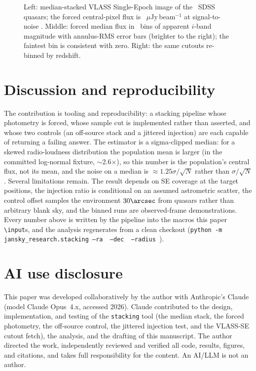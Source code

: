 \documentclass[twocolumn]{aastex631}
\newcommand{\code}[1]{\texttt{#1}}
\begin{document}
\begin{figure}
\caption{Left: median-stacked VLASS Single-Epoch image of the \stN\ SDSS quasars; the forced
central-pixel flux is \stFlux~$\mu$Jy\,beam$^{-1}$ at signal-to-noise \stSNR. Middle: forced median
flux in \stNbins\ bins of apparent $i$-band magnitude with annulus-RMS error bars (brighter to the
right); the faintest bin is consistent with zero. Right: the same cutouts re-binned by redshift.}
\label{fig:stack}
\end{figure}

\section{Discussion and reproducibility}
The contribution is tooling and reproducibility: a stacking pipeline whose photometry is forced,
whose sample cut is implemented rather than asserted, and whose two controls (an off-source
stack and a jittered injection) are each capable of returning a failing answer. The estimator is
a sigma-clipped median: for a skewed radio-loudness distribution the population mean is
larger (in the committed log-normal fixture, $\sim$2.6$\times$), so this number is the population's
central flux, not its mean, and the noise on a median is $\approx1.25\sigma/\sqrt{N}$ rather than
$\sigma/\sqrt{N}$. Several limitations remain. The result depends on SE coverage at the target
positions, the injection ratio is conditional on an assumed astrometric scatter, the control offset
samples the environment $30\arcsec$ from quasars rather than arbitrary blank sky, and the binned
runs are observed-frame demonstrations. Every number above is written by the pipeline into the macros this
paper \code{\textbackslash input}s, and the analysis regenerates from a clean checkout
(\code{python -m jansky\_research.stacking --ra \stFieldRa\ --dec \stFieldDec\ --radius \stRadius}).

\section*{AI use disclosure}
This paper was developed collaboratively by the author with Anthropic's Claude
\citep{anthropicclaude} (model Claude Opus~4.x, accessed 2026). Claude contributed to the design,
implementation, and testing of the \code{stacking} tool (the median stack, the forced photometry,
the off-source control, the jittered injection test, and the VLASS-SE cutout fetch), the analysis,
and the drafting of this manuscript. The author directed the work, independently reviewed and
verified all code, results, figures, and citations, and takes full responsibility for the content.
An AI/LLM is not an author.
\end{document}
